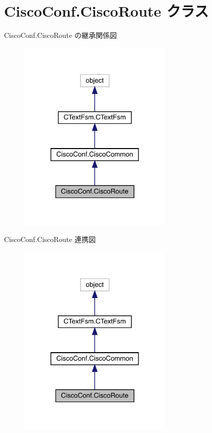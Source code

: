 \hypertarget{classCiscoConf_1_1CiscoRoute}{}\section{Cisco\+Conf.\+Cisco\+Route クラス}
\label{classCiscoConf_1_1CiscoRoute}


Cisco\+Conf.\+Cisco\+Route の継承関係図
\nopagebreak
\begin{figure}[H]
\begin{center}
\leavevmode
\includegraphics[width=210pt]{classCiscoConf_1_1CiscoRoute__inherit__graph}
\end{center}
\end{figure}


Cisco\+Conf.\+Cisco\+Route 連携図
\nopagebreak
\begin{figure}[H]
\begin{center}
\leavevmode
\includegraphics[width=210pt]{classCiscoConf_1_1CiscoRoute__coll__graph}
\end{center}
\end{figure}
